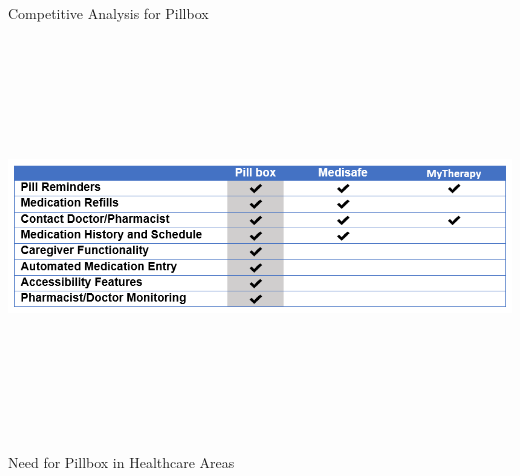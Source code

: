 \documentclass[22pt]{beamer}
\begin{document}
\begin{frame}[fragile]
\begin{textblock}{7.25}
\begin{block}{Competitive Analysis for Pillbox}
\begin{center}
\includegraphics[height=10.5cm]{CompetitiveAdvantage.png}
\end{center}
\end{block}

\begin{block}{Need for Pillbox in Healthcare Areas}



\end{block}
\end{textblock}
\end{frame}
\end{document}
